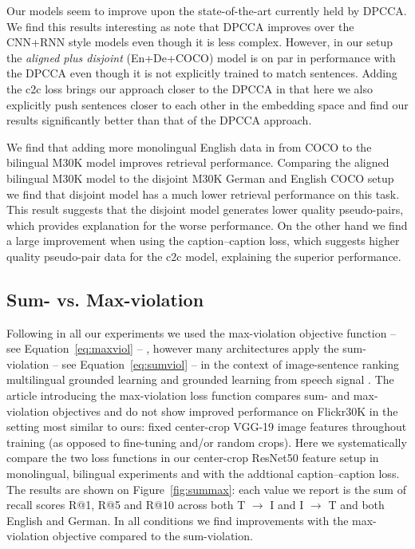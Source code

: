 Our models seem to improve upon the state-of-the-art currently
held by DPCCA.  We find this results interesting as 
\cite{rajendran2015bridge} note that DPCCA improves over the
CNN+RNN style models even though it is less complex. However,
in our setup the \emph{aligned plus disjoint} (En+De+COCO) model
is on par in performance with the DPCCA even though it is not 
explicitly trained to match sentences.
Adding the c2c loss brings our approach closer to the 
DPCCA in that here we also explicitly push sentences closer 
to each other in the embedding space and find our results
significantly better than that of the
DPCCA approach. 

We find that adding more monolingual English data
in from COCO to the bilingual M30K model improves retrieval
performance. Comparing the aligned bilingual M30K model to the disjoint M30K German and 
English COCO setup we find that disjoint model has a much lower retrieval performance on
this task. This result suggests that the disjoint model generates lower quality pseudo-pairs,
which provides explanation for the worse performance. On the other hand we find a large  
improvement when using the caption--caption loss, which suggests higher quality pseudo-pair 
data for the c2c model, explaining the superior performance.

\subsection{Sum- vs. Max-violation}


Following \cite{kadar2018conll} in all our experiments we used the max-violation 
objective function -- see Equation~\ref{eq:maxviol} -- , however many architectures apply
the sum-violation -- see Equation~\ref{eq:sumviol} --  in the context of image-sentence 
ranking \cite{nam2017dual} multilingual grounded learning \cite{gella2017image} and 
grounded learning from speech signal \cite{chrupala2017representations}. The article
introducing the max-violation loss function \cite{faghri2017vse++} compares sum- and 
max-violation objectives and do not show improved performance on Flickr30K 
in the setting most similar to
ours: fixed center-crop VGG-19 image features throughout training (as opposed to fine-tuning 
and/or random crops). Here we systematically compare the two loss functions 
in our center-crop 
ResNet50 feature setup in monolingual, bilingual experiments and with the addtional 
caption--caption loss.  The results are shown on Figure~\ref{fig:summax}: each 
value we report is the sum of recall scores R@1, R@5 and R@10
across both T $\rightarrow$ I and I $\rightarrow$ T and both
English and German.
In all conditions we find improvements with the max-violation objective
compared to the sum-violation.

